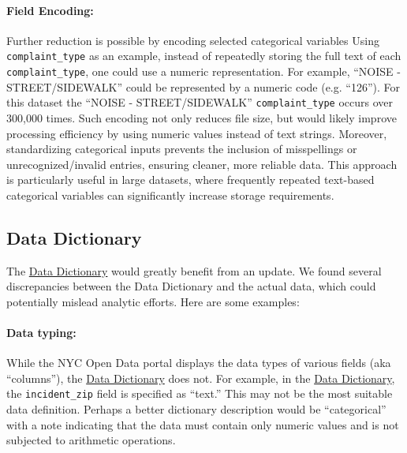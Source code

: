 \documentclass[linenumber]{jdsart}
\begin{document}
\paragraph{Field Encoding:} Further reduction is possible 
by encoding selected categorical variables 
Using \texttt{complaint\_type} as an example,
instead of repeatedly storing the full text of each \texttt{complaint\_type}, 
one could use a numeric representation. For example, 
``NOISE - STREET/SIDEWALK'' could be represented by a 
numeric code (e.g. ``126''). For this dataset the 
``NOISE - STREET/SIDEWALK'' \texttt{complaint\_type} occurs 
over 300,000 times. Such encoding not only reduces file 
size, but would likely improve processing efficiency by using numeric
values instead of text strings. Moreover, standardizing 
categorical inputs prevents the inclusion of misspellings 
or unrecognized/invalid entries, ensuring cleaner, more reliable 
data. This approach is particularly useful in large datasets, where 
frequently repeated text\mbox{-}based categorical variables can 
significantly increase storage requirements. 

\subsection{Data Dictionary} 
\label{sec:datadictionary}
The \href{https://data.cityofnewyork.us/api/views/erm2-nwe9/files/b372b884-f86a-453b-ba16-1fe06ce9d212?download=true&filename=311_ServiceRequest_2010-Present_DataDictionary_Updated_2023.xlsx}{Data Dictionary} would greatly benefit from an update. We found several discrepancies between the 
Data Dictionary and the actual data, which could potentially 
mislead analytic efforts. Here are some examples:

\paragraph{Data typing:} While the NYC Open Data portal displays the data types of 
various fields (aka ``columns''), the \href{https://data.cityofnewyork.us/api/views/erm2-nwe9/files/b372b884-f86a-453b-ba16-1fe06ce9d212?download=true&filename=311_ServiceRequest_2010-Present_DataDictionary_Updated_2023.xlsx}{Data Dictionary} does 
not. For example, in the \href{https://data.cityofnewyork.us/api/views/erm2-nwe9/files/b372b884-f86a-453b-ba16-1fe06ce9d212?download=true&filename=311_ServiceRequest_2010-Present_DataDictionary_Updated_2023.xlsx}{Data Dictionary}, 
the \texttt{incident\_zip} field is specified as ``text.'' This may 
not be the most suitable data definition. Perhaps a better 
dictionary description would be  ``categorical'' with a note 
indicating that the data must contain only numeric values 
and is not subjected to arithmetic operations.
\end{document}

